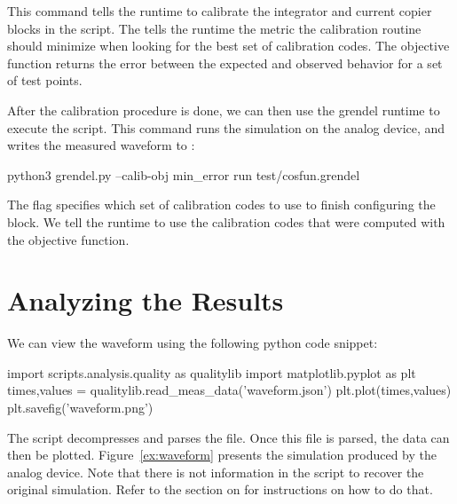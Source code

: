 This command tells the \grendel runtime to calibrate the integrator and current
copier blocks in the script. The  tells the \grendel runtime the
metric the calibration routine should minimize when looking for the best set of
calibration codes. The  objective function returns the error
between the expected and observed behavior for a set of test points.

After the calibration procedure is done, we can then use the grendel runtime to
execute the script. This command runs the simulation on the analog device, and
writes the measured waveform to :

\begin{snippet}
python3 grendel.py --calib-obj min_error run test/cosfun.grendel
\end{snippet}

The  flag specifies which set of calibration codes to use to finish
configuring the block. We tell the \grendel runtime to use the calibration codes
that were computed with the  objective function.

\section{Analyzing the Results}

We can view the waveform using the following python code snippet:

\begin{pysnippet}
  import scripts.analysis.quality as qualitylib
  import matplotlib.pyplot as plt
  times,values = qualitylib.read_meas_data('waveform.json')
  plt.plot(times,values)
  plt.savefig('waveform.png')
\end{pysnippet}

The  script decompresses and parses the  file. Once
this file is parsed, the data can then be plotted. Figure~\ref{ex:waveform} presents the
simulation produced by the analog device. Note that there is not information in
the \grendel script to recover the original simulation. Refer to the section on
\expdriver for instructions on how to do that.

